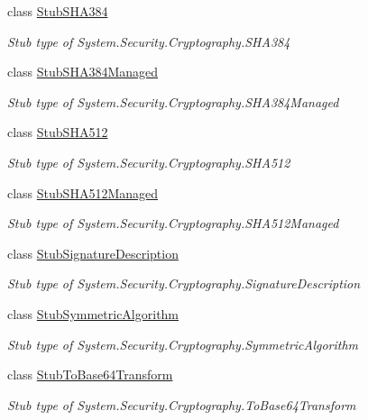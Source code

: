 \begin{DoxyCompactItemize}
class \hyperlink{class_system_1_1_security_1_1_cryptography_1_1_fakes_1_1_stub_s_h_a384}{Stub\-S\-H\-A384}
\begin{DoxyCompactList}\small\item\em Stub type of System.\-Security.\-Cryptography.\-S\-H\-A384\end{DoxyCompactList}\item 
class \hyperlink{class_system_1_1_security_1_1_cryptography_1_1_fakes_1_1_stub_s_h_a384_managed}{Stub\-S\-H\-A384\-Managed}
\begin{DoxyCompactList}\small\item\em Stub type of System.\-Security.\-Cryptography.\-S\-H\-A384\-Managed\end{DoxyCompactList}\item 
class \hyperlink{class_system_1_1_security_1_1_cryptography_1_1_fakes_1_1_stub_s_h_a512}{Stub\-S\-H\-A512}
\begin{DoxyCompactList}\small\item\em Stub type of System.\-Security.\-Cryptography.\-S\-H\-A512\end{DoxyCompactList}\item 
class \hyperlink{class_system_1_1_security_1_1_cryptography_1_1_fakes_1_1_stub_s_h_a512_managed}{Stub\-S\-H\-A512\-Managed}
\begin{DoxyCompactList}\small\item\em Stub type of System.\-Security.\-Cryptography.\-S\-H\-A512\-Managed\end{DoxyCompactList}\item 
class \hyperlink{class_system_1_1_security_1_1_cryptography_1_1_fakes_1_1_stub_signature_description}{Stub\-Signature\-Description}
\begin{DoxyCompactList}\small\item\em Stub type of System.\-Security.\-Cryptography.\-Signature\-Description\end{DoxyCompactList}\item 
class \hyperlink{class_system_1_1_security_1_1_cryptography_1_1_fakes_1_1_stub_symmetric_algorithm}{Stub\-Symmetric\-Algorithm}
\begin{DoxyCompactList}\small\item\em Stub type of System.\-Security.\-Cryptography.\-Symmetric\-Algorithm\end{DoxyCompactList}\item 
class \hyperlink{class_system_1_1_security_1_1_cryptography_1_1_fakes_1_1_stub_to_base64_transform}{Stub\-To\-Base64\-Transform}
\begin{DoxyCompactList}\small\item\em Stub type of System.\-Security.\-Cryptography.\-To\-Base64\-Transform\end{DoxyCompactList}\item 

\end{DoxyCompactItemize}
